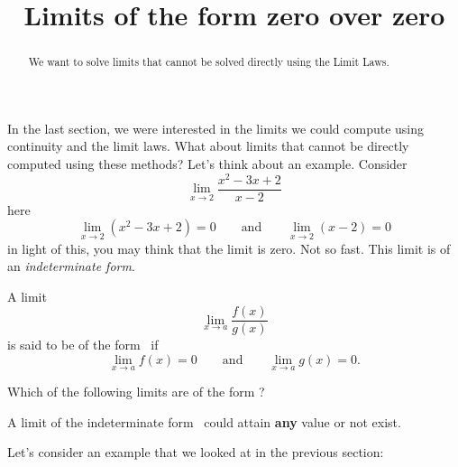 \documentclass{ximera}
\title[Dig-In:]{Limits of the form zero over zero}
\begin{document}
\begin{abstract}
  We want to solve limits that cannot be solved directly using the
  Limit Laws.
\end{abstract}

\maketitle

In the last section, we were interested in the limits we could compute
using continuity and the limit laws. What about limits that cannot be
directly computed using these methods? Let's think about an example. Consider
\[
\lim_{x\to 2}\frac{x^2-3x+2}{x-2}
\]
here 
\[
\lim_{x\to 2}\left(x^2-3x+2\right) = 0\qquad\text{and}\qquad \lim_{x\to
  2}\left(x-2\right) = 0
\]
in light of this, you may think that the limit is zero. Not so
fast. This limit is of an \textit{indeterminate form}.

\begin{definition}
  A limit
  \[
  \lim_{x\to a} \frac{f(x)}{g(x)}
  \]
  is said to be of the form \zeroOverZero\ if
  \[
  \lim_{x\to a} f(x) = 0\qquad\text{and}\qquad \lim_{x\to a} g(x) =0.
  \]
\end{definition}

\begin{question}
  Which of the following limits are of the form \zeroOverZero?
  \begin{multipleChoice}
  \end{multipleChoice}
\end{question}

\begin{warning}
  A limit of the indeterminate form \zeroOverZero\ could attain
  \textbf{any} value or not exist.
\end{warning}

Let's consider an example that we looked at in the previous section:
\end{document}
